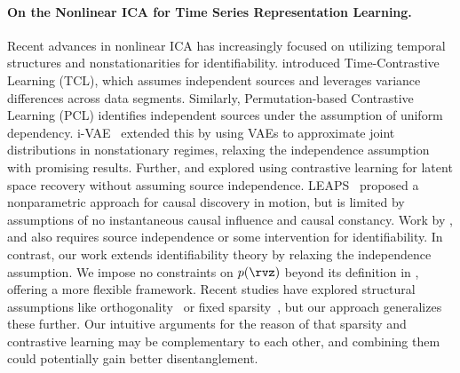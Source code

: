 \documentclass{article} %
\theoremstyle{plain}
\theoremstyle{definition}
\theoremstyle{remark}
\numberwithin{equation}{section}
\begin{document}
\paragraph{On the Nonlinear ICA for Time Series Representation Learning.} Recent advances in nonlinear ICA has increasingly focused on utilizing temporal structures and nonstationarities for identifiability. \citep{TCL2016} introduced Time-Contrastive Learning (TCL), which assumes independent sources and leverages variance differences across data segments. Similarly, Permutation-based Contrastive Learning (PCL) identifies independent sources under the assumption of uniform dependency. i-VAE~\citep{iVAEkhemakhem20a} extended this by using VAEs to approximate joint distributions in nonstationary regimes, relaxing the independence assumption with promising results. Further, \citep{roth_disentanglement_2023} and \citep{oublal2024disentangling} explored using contrastive learning for latent space recovery without assuming source independence. LEAPS~\citep{yao2021learning} proposed a nonparametric approach for causal discovery in motion, but is limited by assumptions of no instantaneous causal influence and causal constancy. Work by \citep{lachapelle2022disentanglement}, and \citep{klindt2020towards} also requires source independence or some intervention \citep{ahuja_interventional_2023} for identifiability. In contrast, our work extends identifiability theory by relaxing the independence assumption. We impose no constraints on \( p(\rvz) \) beyond its definition in , offering a more flexible framework. Recent studies have explored structural assumptions like orthogonality~\citep{gresele2021independent, zheng2022on} or fixed sparsity~\citep{moran2022identifiable}, but our approach generalizes these further. Our intuitive arguments for the reason of that sparsity and contrastive learning may be
complementary to each other, and combining them could potentially gain better disentanglement.

\end{document}
